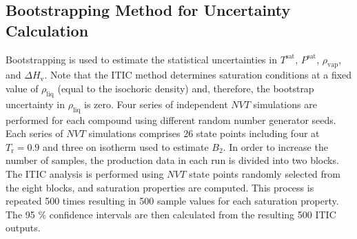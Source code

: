 \documentclass[5p,times]{elsarticle}
\begin{document}



\subsection{Bootstrapping Method for Uncertainty Calculation}\label{sec:bootstrapping}
Bootstrapping is used to estimate the statistical uncertainties \cite{Efron1981} in $T^\mathrm{sat}$, $P^\mathrm{sat}$, $\rho_\mathrm{vap}$, and $\Delta H_\mathrm{v}$. Note that the ITIC method determines saturation conditions at a fixed value of $\rho_{\mathrm{liq}}$ (equal to the isochoric density) and, therefore, the bootstrap uncertainty in $\rho_{\mathrm{liq}}$ is zero. Four series of independent $NVT$ simulations are performed for each compound using different random number generator seeds. Each series of $NVT$ simulations comprises 26 state points including four at $T_\mathrm{r}=0.9$ and three on isotherm used to estimate $B_2$. In order to increase the number of samples, the production data in each run is divided into two blocks. The ITIC analysis is performed using $NVT$ state points randomly selected from the eight blocks, and saturation properties are computed. This process is repeated 500 times resulting in 500 sample values for each saturation property. The 95 \% confidence intervals are then calculated from the resulting 500 ITIC outputs. 
\end{document}
